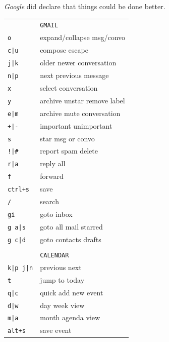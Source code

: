 \documentclass[a4paper,12pt]{article}
\begin{document}
\begin{multicols}{2}
\vfill
%
\emph{Google} did declare that things could be done better.

\bigskip

\begin{tabular}{ll}
&\texttt{GMAIL}\\
\texttt{o}&expand/collapse msg/convo\\
\texttt{c|u}&compose \textbar{} escape\\
\texttt{j|k}&older \textbar{} newer conversation\\
\texttt{n|p}&next \textbar{} previous message\\
\texttt{x}&select conversation\\
\texttt{y}&archive \textbar{} unstar \textbar{} remove label\\
\texttt{e|m}&archive \textbar{} mute conversation\\
\texttt{+|-}&important \textbar{} unimportant\\
\texttt{s}&star msg or convo\\ 
\texttt{!|\#}&report spam \textbar{} delete\\ 
\texttt{r|a}&reply \textbar{} all\\ 
\texttt{f}&forward\\ 
\texttt{ctrl+s}&save\\
\texttt{/}&search\\ 
\texttt{gi}&goto inbox\\
\texttt{g a|s}&goto all mail \textbar{} starred\\ 
\texttt{g c|d}&goto contacts \textbar{} drafts\\ 
&\\
&\texttt{CALENDAR}\\
\texttt{k|p j|n}&previous next\\
\texttt{t}&jump to today\\
\texttt{q|c}&quick add \textbar{} new event\\
\texttt{d|w}&day \textbar{} week view\\
\texttt{m|a}&month \textbar{} agenda view\\
\texttt{alt+s}&save event\\

\end{tabular}
\end{multicols}
\end{document}

